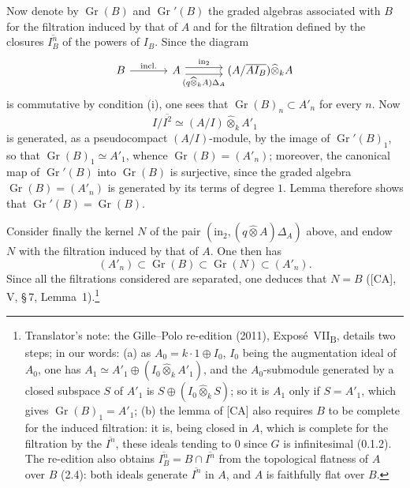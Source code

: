 
Now denote by \(\operatorname{Gr}(B)\) and \(\operatorname{Gr}'(B)\) the
graded algebras associated with \(B\) for the filtration induced by
that of \(A\) and for the filtration defined by the closures
\(\overline{I_B^n}\) of the powers of \(I_B\). Since the diagram
\[
  \begin{tikzcd}[column sep=3.4em]
    B \arrow[r,"\mathrm{incl.}"]
    & A
      \arrow[r,shift left=0.7ex,"\mathrm{in}_2"]
      \arrow[r,shift right=0.7ex,"(q\widehat\otimes_kA)\Delta_A"']
    & (A/\overline{AI_B})\widehat\otimes_kA
  \end{tikzcd}
\]
is commutative by condition \textup{(i)}, one sees that
\(\operatorname{Gr}(B)_n\subset A'_n\) for every \(n\). Now
\[
  I/\overline{I^2}\simeq(A/I)\widehat\otimes_kA'_1
\]
is generated, as a pseudocompact \((A/I)\)-module, by the image of
\(\operatorname{Gr}'(B)_1\), so that
\(\operatorname{Gr}(B)_1\simeq A'_1\), whence
\(\operatorname{Gr}(B)=(A'_n)\); moreover, the canonical map of
\(\operatorname{Gr}'(B)\) into \(\operatorname{Gr}(B)\) is surjective,
since the graded algebra \(\operatorname{Gr}(B)=(A'_n)\) is generated
by its terms of degree \(1\). Lemma  therefore shows that
\(\operatorname{Gr}'(B)=\operatorname{Gr}(B)\).

Consider finally the kernel \(N\) of the pair
\((\mathrm{in}_2,(q\widehat\otimes A)\Delta_A)\) above, and endow
\(N\) with the filtration induced by that of \(A\). One then has
\[
  (A'_n)
  \subset\operatorname{Gr}(B)
  \subset\operatorname{Gr}(N)
  \subset(A'_n).
\]
Since all the filtrations considered are separated, one deduces that
\(N=B\) \textup{([CA], V, \S\,7, Lemma~1)}.\footnote{Translator's note: the Gille--Polo
re-edition (2011), Expos\'e~VII\textsubscript{B}, details two steps; in our words: (a) as
\(A_0=k\cdot1\oplus I_0\), \(I_0\) being the augmentation ideal of \(A_0\), one has
\(A_1\simeq A'_1\oplus(I_0\widehat\otimes_kA'_1)\), and the \(A_0\)-submodule generated by a closed subspace
\(S\) of \(A'_1\) is \(S\oplus(I_0\widehat\otimes_kS)\); so it is \(A_1\) only if \(S=A'_1\), which gives
\(\operatorname{Gr}(B)_1=A'_1\); (b) the lemma of [CA] also requires \(B\) to be complete for the induced
filtration: it is, being closed in \(A\), which is complete for the filtration by the \(\overline{I^n}\),
these ideals tending to \(0\) since \(G\) is infinitesimal (0.1.2). The re-edition also obtains
\(\overline{I_B^n}=B\cap\overline{I^n}\) from the topological flatness of \(A\) over \(B\) (2.4): both ideals
generate \(\overline{I^n}\) in \(A\), and \(A\) is faithfully flat over \(B\).}
